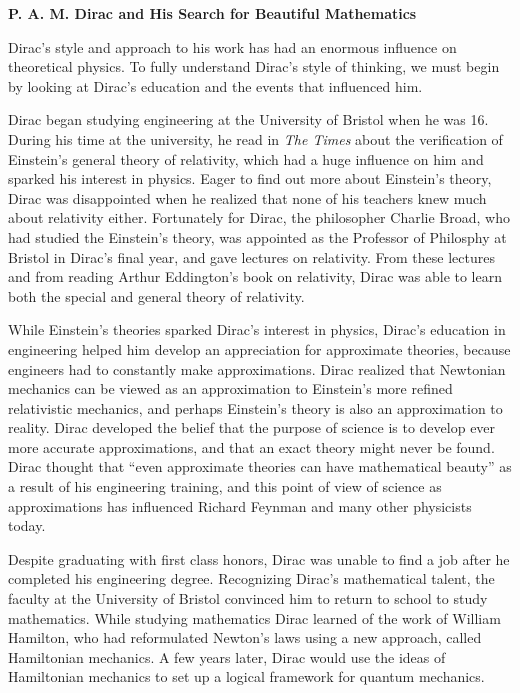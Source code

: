 \documentclass[12pt, oneside, letterpaper, fleqn]{article}
\begin{document}
\begin{center}
\textbf{P. A. M. Dirac and His Search for Beautiful Mathematics}
\end{center}

Dirac's style and approach to his work has had an enormous influence
on theoretical physics. To fully understand Dirac's style of thinking,
we must begin by looking at Dirac's education and the events that
influenced him.

Dirac began studying engineering at the University of Bristol when he
was 16. During his time at the university, he read in \textit{The Times}
about the verification of Einstein's general theory of relativity, which
had a huge influence on him and sparked his interest in physics. Eager
to find out more about Einstein's theory, Dirac was disappointed when he
realized that none of his teachers knew much about relativity either.
Fortunately for Dirac, the philosopher Charlie Broad, who had studied the
Einstein's theory, was appointed as the Professor of Philosphy at
Bristol in Dirac's final year, and gave lectures on relativity. From
these lectures and from reading Arthur Eddington's book on relativity,
Dirac was able to learn both the special and general theory of
relativity.

While Einstein's theories sparked Dirac's interest in physics, Dirac's
education in engineering helped him develop an appreciation for
approximate theories, because engineers had to constantly make
approximations. Dirac realized that Newtonian mechanics can be viewed as
an approximation to Einstein's more refined relativistic mechanics, and
perhaps Einstein's theory is also an approximation to reality. Dirac
developed the belief that the purpose of science is to develop ever more
accurate approximations, and that an exact theory might never be found.
Dirac thought that ``even approximate theories can have mathematical
beauty'' \cite[pg. 45]{strangest_man} as a result of his engineering training,
and this point of view of science as approximations has influenced
Richard Feynman and many other physicists today.

Despite graduating with first class honors, Dirac was unable to find a
job after he completed his engineering degree. Recognizing Dirac's
mathematical talent, the faculty at the University of Bristol convinced
him to return to school to study mathematics. While studying mathematics
Dirac learned of the work of William Hamilton, who had reformulated
Newton's laws using a new approach, called Hamiltonian mechanics. A few
years later, Dirac would use the ideas of Hamiltonian mechanics to set up a
logical framework for quantum mechanics.
\end{document}
